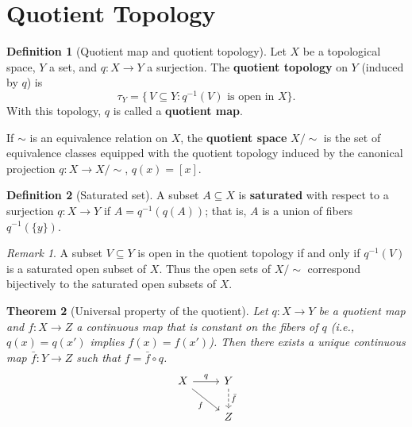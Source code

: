 \documentclass[11pt,a4paper,twoside]{book}
\newtheorem{theorem}{Theorem}[section]
\theoremstyle{remark}
\newtheorem{remark}[theorem]{Remark}
\theoremstyle{definition}
\theoremstyle{definition}
\newtheorem{definition}{Definition}[section]
\begin{document}
\section{Quotient Topology}\label{sec:quotient-topology}

\begin{definition}[Quotient map and quotient topology]
\label{def:quotient-map}
Let $X$ be a topological space, $Y$ a set, and $q\colon X\to Y$
a surjection.  The \textbf{quotient topology} on $Y$ (induced
by $q$) is
\[
   \tau_Y = \bigl\{\,V\subseteq Y : q^{-1}(V)\text{ is open in }X\bigr\}.
\]
With this topology, $q$ is called a \textbf{quotient map}.

If $\sim$ is an equivalence relation on $X$, the \textbf{quotient
space} $X/{\sim}$ is the set of equivalence classes equipped with
the quotient topology induced by the canonical projection
$q\colon X\to X/{\sim}$, $q(x)=[x]$.
\end{definition}

\begin{definition}[Saturated set]\label{def:saturated}
A subset $A\subseteq X$ is \textbf{saturated} with respect to
a surjection $q\colon X\to Y$ if $A=q^{-1}(q(A))$; that is,
$A$ is a union of fibers $q^{-1}(\{y\})$.
\end{definition}

\begin{remark}\label{rem:saturated-characterization}
A subset $V\subseteq Y$ is open in the quotient topology if and
only if $q^{-1}(V)$ is a saturated open subset of $X$.  Thus the
open sets of $X/{\sim}$ correspond bijectively to the saturated
open subsets of $X$.
\end{remark}

\begin{theorem}[Universal property of the quotient]
\label{thm:quotient-universal}
Let $q\colon X\to Y$ be a quotient map and $f\colon X\to Z$ a
continuous map that is constant on the fibers of $q$ (i.e.,
$q(x)=q(x')$ implies $f(x)=f(x')$).  Then there exists a unique
continuous map $\bar{f}\colon Y\to Z$ such that $f=\bar{f}\circ q$.
\[
\begin{tikzcd}
X \arrow[r, "q"] \arrow[dr, "f"'] & Y \arrow[d, dashed, "\bar{f}"] \\
& Z
\end{tikzcd}
\]
\end{theorem}
\end{document}
